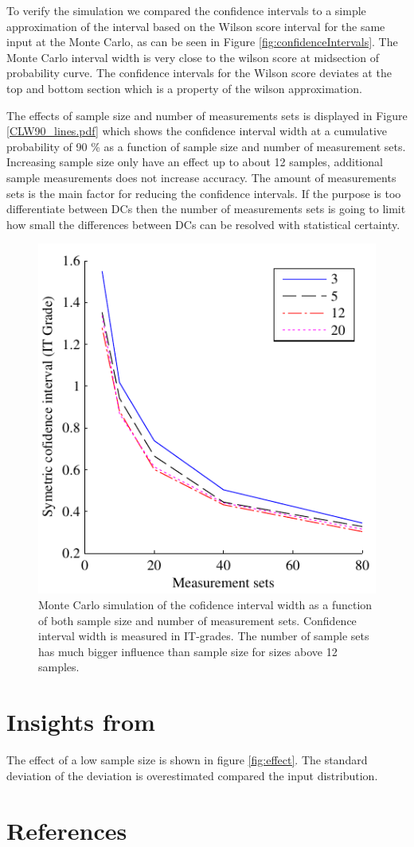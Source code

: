 \documentclass[aip,amsmath, preprint, author-year]{revtex4-1}
\begin{document}
To verify the simulation we compared the confidence intervals to a simple approximation of the interval based on the Wilson score interval for the same input at the Monte Carlo, as can be seen in Figure \ref{fig:confidenceIntervals}. The Monte Carlo interval width is very close to the wilson score at midsection of probability curve. 
The confidence intervals for the Wilson score deviates at the top and bottom section which is a property of the wilson approximation.

The effects of sample size and number of measurements sets is displayed in Figure \ref{CLW90_lines.pdf} which shows the confidence interval width at a cumulative probability of 90 \% as a function of sample size and number of measurement sets. 
Increasing sample size only have an effect up to about 12 samples, additional sample measurements does not increase accuracy. 
The amount of measurements sets is the main factor for reducing the confidence intervals. 
If the purpose is too differentiate between DCs then the number of measurements sets is going to limit how small the differences between DCs can be resolved with statistical certainty.

\begin{figure}
\includegraphics{CLW90_lines.pdf}
\caption{\label{fig:cl_line} Monte Carlo simulation of the cofidence interval width as a function of both sample size and number of measurement sets. 
Confidence interval width is measured in IT-grades. 
The number of sample sets has much bigger influence than sample size for sizes above 12 samples.}
\end{figure}



\section{Insights from }


The effect of a low sample size is shown in figure \ref{fig:effect}. 
The standard deviation of the deviation is overestimated compared the input distribution.

\section*{References}

\end{document}
